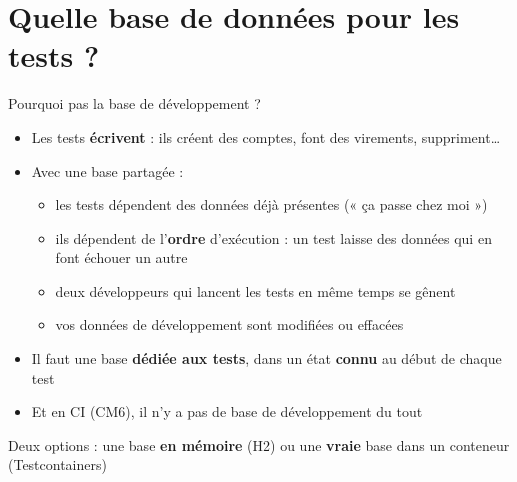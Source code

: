\documentclass[aspectratio=169,10pt]{beamer}
\begin{document}
\section{Quelle base de données pour les tests ?}

\begin{frame}{Pourquoi pas la base de développement ?}
  \begin{itemize}
    \item Les tests \textbf{écrivent} : ils créent des comptes, font des virements, suppriment\ldots
    \item Avec une base partagée :
      \begin{itemize}
        \item les tests dépendent des données déjà présentes (« ça passe chez moi »)
        \item ils dépendent de l'\textbf{ordre} d'exécution : un test laisse des données qui en font échouer un autre
        \item deux développeurs qui lancent les tests en même temps se gênent
        \item vos données de développement sont modifiées ou effacées
      \end{itemize}
    \item Il faut une base \textbf{dédiée aux tests}, dans un état \textbf{connu} au début de chaque test
    \item Et en CI (CM6), il n'y a pas de base de développement du tout
  \end{itemize}
  \vspace{2mm}
  \begin{center}
    Deux options : une base \textbf{en mémoire} (H2) ou une \textbf{vraie} base dans un conteneur (Testcontainers)
  \end{center}
\end{frame}
\end{document}
